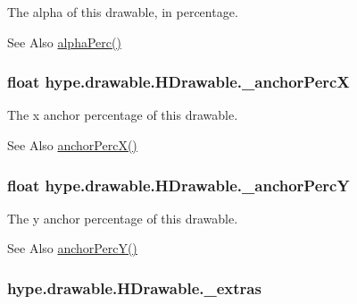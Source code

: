 The alpha of this drawable, in percentage. 

\begin{DoxySeeAlso}{See Also}
\hyperlink{classhype_1_1drawable_1_1_h_drawable_a6c3f8eae8eeaa68ee76003d732b99bac}{alpha\-Perc()} 
\end{DoxySeeAlso}
\hypertarget{classhype_1_1drawable_1_1_h_drawable_a98b48c17667a22aaa8adfdedbd040661}{
\subsubsection[{\-\_\-anchor\-Perc\-X}]{\setlength{\rightskip}{0pt plus 5cm}float hype.\-drawable.\-H\-Drawable.\-\_\-anchor\-Perc\-X\hspace{0.3cm}{\ttfamily [protected]}}}\label{classhype_1_1drawable_1_1_h_drawable_a98b48c17667a22aaa8adfdedbd040661}


The x anchor percentage of this drawable. 

\begin{DoxySeeAlso}{See Also}
\hyperlink{classhype_1_1drawable_1_1_h_drawable_a4c0158fa8194cfe3424714f16e700b5e}{anchor\-Perc\-X()} 
\end{DoxySeeAlso}
\hypertarget{classhype_1_1drawable_1_1_h_drawable_a5b0e557854feedc7e19292bdb28c7739}{
\subsubsection[{\-\_\-anchor\-Perc\-Y}]{\setlength{\rightskip}{0pt plus 5cm}float hype.\-drawable.\-H\-Drawable.\-\_\-anchor\-Perc\-Y\hspace{0.3cm}{\ttfamily [protected]}}}\label{classhype_1_1drawable_1_1_h_drawable_a5b0e557854feedc7e19292bdb28c7739}


The y anchor percentage of this drawable. 

\begin{DoxySeeAlso}{See Also}
\hyperlink{classhype_1_1drawable_1_1_h_drawable_ac46830b7986dfc9ad6ddbf923e939bc1}{anchor\-Perc\-Y()} 
\end{DoxySeeAlso}
\hypertarget{classhype_1_1drawable_1_1_h_drawable_a77a64d01b7766ad4d0e338f82ab23f12}{
\subsubsection[{\-\_\-extras}]{ hype.\-drawable.\-H\-Drawable.\-\_\-extras\hspace{0.3cm}{\ttfamily [protected]}}}\label{classhype_1_1drawable_1_1_h_drawable_a77a64d01b7766ad4d0e338f82ab23f12}


